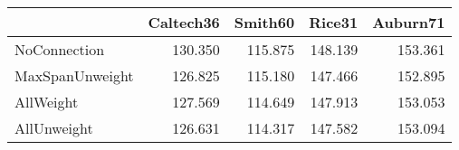 \begin{tabular}{lrrrr}
\toprule
{} & Caltech36 & Smith60 &  Rice31 & Auburn71 \\
\midrule
NoConnection    &   130.350 & 115.875 & 148.139 &  153.361 \\
MaxSpanUnweight &   126.825 & 115.180 & 147.466 &  152.895 \\
AllWeight       &   127.569 & 114.649 & 147.913 &  153.053 \\
AllUnweight     &   126.631 & 114.317 & 147.582 &  153.094 \\
\bottomrule
\end{tabular}
